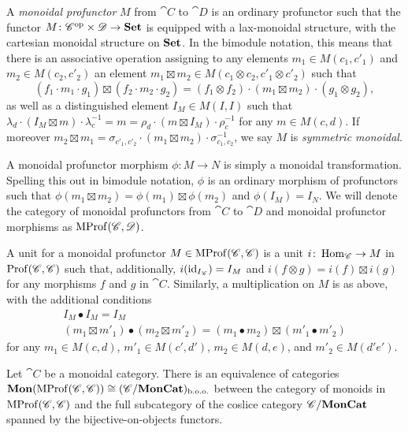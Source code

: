 A \emph{monoidal profunctor} $M$ from $\cat{C}$ to $\cat{D}$ is an ordinary profunctor such that the functor $M\colon {\mathscr{C}}^{\text{op}}\times\mathscr{D}\to\mathbf{Set}$ is equipped with a lax-monoidal structure, with the cartesian monoidal structure on $\mathbf{Set}$. In the bimodule notation, this means that there is an associative operation assigning to any elements $m_1\in M(c_1,c'_1)$ and $m_2\in M(c_2,c'_2)$ an element $m_1\boxtimes m_2\in M(c_1\otimes c_2,c'_1\otimes c'_2)$ such that
\[
	(f_1\cdot m_1\cdot g_1)\boxtimes(f_2\cdot m_2\cdot g_2) = (f_1\otimes f_2)\cdot(m_1\boxtimes m_2)\cdot(g_1\otimes g_2),
\]
as well as a distinguished element $I_M\in M(I,I)$ such that $\lambda_d\cdot(I_M\boxtimes m)\cdot\lambda^{-1}_c = m = \rho_d\cdot(m\boxtimes I_M)\cdot\rho^{-1}_c$ for any $m\in M(c,d)$. If moreover $m_2\boxtimes m_1 = \sigma_{c'_1,c'_2}\cdot(m_1\boxtimes m_2)\cdot\sigma_{c_1,c_2}^{-1}$, we say $M$ is \emph{symmetric monoidal}.

A monoidal profunctor morphism $\phi\colon M\to N$ is simply a monoidal transformation. Spelling this out in bimodule notation, $\phi$ is an ordinary morphism of profunctors such that $\phi(m_1\boxtimes m_2)=\phi(m_1)\boxtimes\phi(m_2)$ and $\phi(I_M)=I_N$. We will denote the category of monoidal profunctors from $\cat{C}$ to $\cat{D}$ and monoidal profunctor morphisms as $\operatorname{MProf}(\mathscr{C},\mathscr{D})$.

A unit for a monoidal profunctor $M\in\operatorname{MProf}(\mathscr{C},\mathscr{C})$ is a unit $i\colon\operatorname{Hom}_{\mathscr{C}}\to M$ in $\operatorname{Prof}(\mathscr{C},\mathscr{C})$ such that, additionally, $i(\operatorname{id}_{I_{\mathscr{C}}})=I_M$ and $i(f\otimes g)=i(f)\boxtimes i(g)$ for any morphisms $f$ and $g$ in $\cat{C}$. Similarly, a multiplication on $M$ is as above, with the additional conditions
\begin{gather*}
	I_M\bullet I_M=I_M \\
	(m_1\boxtimes m'_1)\bullet(m_2\boxtimes m'_2) = (m_1\bullet m_2)\boxtimes(m'_1\bullet m'_2)
\end{gather*}
for any $m_1\in M(c,d)$, $m'_1\in M(c',d')$, $m_2\in M(d,e)$, and $m'_2\in M(d'e')$.

\begin{lemma}
	Let $\cat{C}$ be a monoidal category. There is an equivalence of categories $\mathbf{Mon}(\operatorname{MProf}(\mathscr{C},\mathscr{C}))\cong (\mathscr{C}/\mathbf{MonCat})_{\text{b.o.o.}}$ between the category of monoids in $\operatorname{MProf}(\mathscr{C},\mathscr{C})$ and the full subcategory of the coslice category $\mathscr{C}/\mathbf{MonCat}$ spanned by the bijective-on-objects functors.
\end{lemma}

